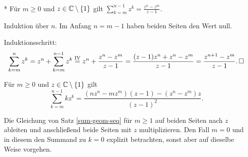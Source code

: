 \begin{Satz}%
\label{sum-geom-seq}\mbox{}\\*
Für $m\ge 0$ und $z\in\mathbb C\setminus\{1\}$ gilt $\sum_{k=m}^{n-1} z^k = \frac{z^n-z^m}{z-1}$.
\end{Satz}
\begin{Beweis}
Induktion über $n$. Im Anfang $n=m-1$ haben beiden Seiten den Wert null.

Induktionsschritt:
\[\sum_{k=m}^n z^k = z^n + \sum_{k=m}^{n-1} z^k
\stackrel{\mathrm{IV}}= z^n + \frac{z^n-z^m}{z-1}
= \frac{(z-1)z^n+z^n-z^m}{z-1}
= \frac{z^{n+1}-z^m}{z-1}.\,\square\]
\end{Beweis}

\begin{Korollar}
Für $m\ge 0$ und $z\in\mathbb C\setminus\{1\}$ gilt
\[\sum_{k=m}^{n-1} kz^k
= \frac{(nz^n-mz^m)(z-1) - (z^n-z^m)z}{(z-1)^2}.\]
\end{Korollar}
\begin{Beweis}
Die Gleichung von Satz \ref{sum-geom-seq} für $m\ge 1$ auf beiden
Seiten nach $z$ ableiten und anschließend beide Seiten mit $z$
multiplizieren. Den Fall $m=0$ und in diesem den Summand zu $k=0$
explizit betrachten, sonst aber auf dieselbe Weise vorgehen.\,\qedsymbol
\end{Beweis}